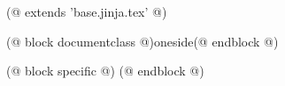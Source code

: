 (@ extends 'base.jinja.tex' @)

(@ block documentclass @)oneside(@ endblock @)

(@ block specific @)
(@ endblock @)
